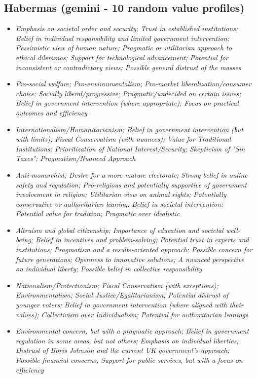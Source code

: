 \documentclass[11pt]{article}
\newcommand{\profiletext}[1]{\textit{#1}}
\begin{document}
\subsection{Habermas (gemini - 10 random value profiles)}
\begin{itemize}
\item \profiletext{Emphasis on societal order and security; Trust in established institutions; Belief in individual responsibility and limited government intervention; Pessimistic view of human nature; Pragmatic or utilitarian approach to ethical dilemmas; Support for technological advancement; Potential for inconsistent or contradictory views; Possible general distrust of the masses}
\item \profiletext{Pro-social welfare; Pro-environmentalism; Pro-market liberalization/consumer choice; Socially liberal/progressive; Pragmatic/undecided on certain issues; Belief in government intervention (where appropriate); Focus on practical outcomes and efficiency}
\item \profiletext{Internationalism/Humanitarianism; Belief in government intervention (but with limits); Fiscal Conservatism (with nuances); Value for Traditional Institutions; Prioritization of National Interest/Security; Skepticism of "Sin Taxes"; Pragmatism/Nuanced Approach}
\item \profiletext{Anti-monarchist; Desire for a more mature electorate; Strong belief in online safety and regulation; Pro-religious and potentially supportive of government involvement in religion; Utilitarian view on animal rights; Potentially conservative or authoritarian leaning; Belief in societal intervention; Potential value for tradition; Pragmatic over idealistic}
\item \profiletext{Altruism and global citizenship; Importance of education and societal well-being; Belief in incentives and problem-solving; Potential trust in experts and institutions; Pragmatism and a results-oriented approach; Possible concern for future generations; Openness to innovative solutions; A nuanced perspective on individual liberty; Possible belief in collective responsibility}
\item \profiletext{Nationalism/Protectionism; Fiscal Conservatism (with exceptions); Environmentalism; Social Justice/Egalitarianism; Potential distrust of younger voters; Belief in government intervention (where aligned with their values); Collectivism over Individualism; Potential for authoritarian leanings}
\item \profiletext{Environmental concern, but with a pragmatic approach; Belief in government regulation in some areas, but not others; Emphasis on individual liberties; Distrust of Boris Johnson and the current UK government's approach; Possible financial concerns; Support for public services, but with a focus on efficiency}

\end{itemize}
\end{document}
